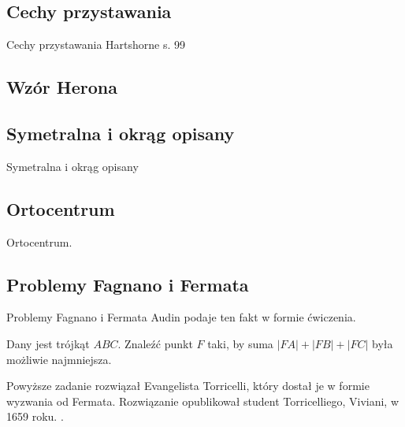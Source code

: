 

\subsection{Cechy przystawania}
Cechy przystawania
\loremipsum
Hartshorne s. 99







\subsection{Wzór Herona}


\subsection{Symetralna i okrąg opisany}
Symetralna i okrąg opisany
\loremipsum

\subsection{Ortocentrum}
Ortocentrum.
\loremipsum

\subsection{Problemy Fagnano i Fermata}
Problemy Fagnano i Fermata
Audin \cite[s. 101]{audin_2003} podaje ten fakt w formie ćwiczenia.


\begin{problem}
	Dany jest trójkąt $ABC$.
	Znaleźć punkt $F$ taki, by suma $|FA| + |FB| + |FC|$ była możliwie najmniejsza.
\end{problem}

Powyższe zadanie rozwiązał Evangelista Torricelli, który dostał je w formie wyzwania od Fermata.
Rozwiązanie opublikował student Torricelliego, Viviani, w 1659 roku.
. %

